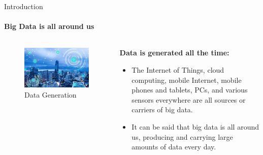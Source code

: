 \documentclass{beamer}
\begin{document}
	\begin{frame}[label=definition]{Introduction}
	\framesubtitle{Big Data is all around us}
		\begin{columns}
			\begin{column}{0.5\textwidth} %
      		\begin{figure}
        		\includegraphics[width=\linewidth]{resources/bigdata1.png} %
        		\caption{Data Generation}
      		\end{figure}
    		\end{column}
    		\begin{column}{0.5\textwidth} %
      		\textbf{Data is generated all the time:}
      		\begin{itemize}
        		\item The Internet of Things, cloud computing, mobile Internet, mobile phones and tablets, PCs, and various sensors everywhere are all sources or carriers of big data.
        		\item It can be said that big data is all around us, producing and carrying large amounts of data every day.
      		\end{itemize}
    		\end{column}
		\end{columns}
	\end{frame}
	
\end{document}
